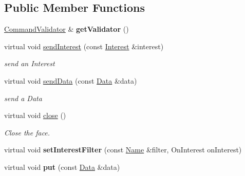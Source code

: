 \subsection*{Public Member Functions}
\begin{DoxyCompactItemize}
\item 
\hyperlink{classnfd_1_1CommandValidator}{Command\+Validator} \& {\bfseries get\+Validator} ()\hypertarget{classnfd_1_1InternalFace_a01bd69722e832a865c97f145b9e5461c}{}\label{classnfd_1_1InternalFace_a01bd69722e832a865c97f145b9e5461c}

\item 
virtual void \hyperlink{classnfd_1_1InternalFace_a3cff8c863714bc322f83343ced8ebf45}{send\+Interest} (const \hyperlink{classndn_1_1Interest}{Interest} \&interest)\hypertarget{classnfd_1_1InternalFace_a3cff8c863714bc322f83343ced8ebf45}{}\label{classnfd_1_1InternalFace_a3cff8c863714bc322f83343ced8ebf45}

\begin{DoxyCompactList}\small\item\em send an Interest \end{DoxyCompactList}\item 
virtual void \hyperlink{classnfd_1_1InternalFace_afd0f09ce7347c26155ccba5500cf4960}{send\+Data} (const \hyperlink{classndn_1_1Data}{Data} \&data)\hypertarget{classnfd_1_1InternalFace_afd0f09ce7347c26155ccba5500cf4960}{}\label{classnfd_1_1InternalFace_afd0f09ce7347c26155ccba5500cf4960}

\begin{DoxyCompactList}\small\item\em send a Data \end{DoxyCompactList}\item 
virtual void \hyperlink{classnfd_1_1InternalFace_aa99a85d1632f5991836e327092ad252a}{close} ()
\begin{DoxyCompactList}\small\item\em Close the face. \end{DoxyCompactList}\item 
virtual void {\bfseries set\+Interest\+Filter} (const \hyperlink{classndn_1_1Name}{Name} \&filter, On\+Interest on\+Interest)\hypertarget{classnfd_1_1InternalFace_a37444c4538db19b434038359737d11e8}{}\label{classnfd_1_1InternalFace_a37444c4538db19b434038359737d11e8}

\item 
virtual void {\bfseries put} (const \hyperlink{classndn_1_1Data}{Data} \&data)\hypertarget{classnfd_1_1InternalFace_abece52e8154e8ac39cd4f4ff759c3248}{}\label{classnfd_1_1InternalFace_abece52e8154e8ac39cd4f4ff759c3248}

\end{DoxyCompactItemize}
